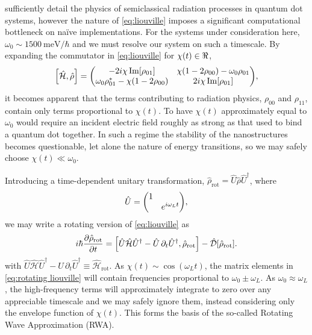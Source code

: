 \documentclass[conference]{IEEEtran}
\begin{document}
 sufficiently detail the physics of semiclassical radiation processes in quantum dot systems, however the nature of \cref{eq:liouville} imposes a significant computational bottleneck on na\"ive implementations.
For the systems under consideration here, $\omega_0 \sim \SI{1500}{\milli\eV}/\hbar$ and we must resolve our system on such a timescale.
By expanding the commutator in \cref{eq:liouville} for $\chi(t) \in \real$,
\begin{equation}
  \commutator{\hat{\mathcal{H}}}{\hat{\rho}} =
  \mqty(
    -2 i \chi \Im[\rho_{01}] & \chi\qty(1 - 2 \rho_{00}) - \omega_0 \rho_{01} \\
    \omega_0 \rho_{01}^* - \chi\qty(1 - 2\rho_{00}) & 2 i \chi \Im[\rho_{01}]
  ),
\end{equation}
it becomes apparent that the terms contributing to radiation physics, $\rho_{00}$ and $\rho_{11}$, contain only terms proportional to $\chi(t)$.
To have $\chi(t)$ approximately equal to $\omega_0$ would require an incident electric field roughly as strong as that used to bind a quantum dot together.
In such a regime the stability of the nanostructures becomes questionable, let alone the nature of energy transitions, so we may safely choose $\chi(t) \ll \omega_0$.


Introducing a time-dependent unitary transformation, $\hat{\rho}_\text{rot} = \hat{U}\hat{\rho}\hat{U}^\dagger$, where
\begin{equation}
  \hat{U} = \mqty(\dmat{1, e^{i \omega_L t}}),
  \label{eq:unitary transformation}
\end{equation}
we may write a rotating version of \cref{eq:liouville} as
\begin{equation}
  i \hbar \pdv{\hat{\rho}_\text{rot}}{t} = \commutator{\hat{U} \hat{\mathcal{H}} \hat{U}^\dagger - \hat{U} \, \partial_t \hat{U}^\dagger}{\hat{\rho}_\text{rot}} - \hat{\mathcal{D}}[\hat{\rho}_\text{rot}].
  \label{eq:rotating liouville}
\end{equation}
with $\hat{U} \hat{\mathcal{H}} \hat{U}^\dagger - \hat{U} \, \partial_t \hat{U}^\dagger \equiv \hat{\mathcal{H}}_\text{rot}$.
As $\chi(t) \sim \cos(\omega_L t)$, the matrix elements in \cref{eq:rotating liouville} will contain frequencies proportional to $\omega_0 \pm \omega_L$.
As $\omega_0 \approx \omega_L$, the high-frequency terms will approximately integrate to zero over any appreciable timescale and we may safely ignore them, instead considering only the envelope function of $\chi(t)$. This forms the basis of the so-called Rotating Wave Approximation (RWA)\cite{Allen1987}.
\end{document}
